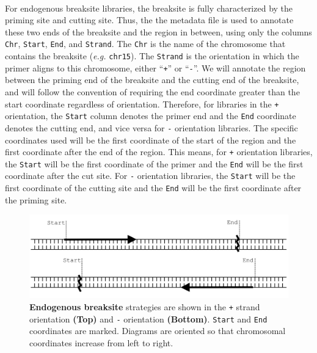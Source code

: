 \documentclass{article}
\begin{document}
\paragraph{} For endogenous breaksite libraries, the breaksite is fully characterized by the priming site and cutting site. Thus, the the metadata file is used to annotate these two ends of the breaksite and the region in between, using only the columns \texttt{Chr}, \texttt{Start}, \texttt{End}, and \texttt{Strand}. The \texttt{Chr} is the name of the chromosome that contains the breaksite (\emph{e.g.} \texttt{chr15}). The \texttt{Strand} is the orientation in which the primer aligns to this chromosome, either ``\texttt{+}'' or ``\texttt{-}''. We will annotate the region between the priming end of the breaksite and the cutting end of the breaksite, and will follow the convention of requiring the end coordinate greater than the start coordinate regardless of orientation. Therefore, for libraries in the \texttt{+} orientation, the \texttt{Start} column denotes the primer end and the \texttt{End} coordinate denotes the cutting end, and vice versa for \texttt{-} orientation libraries. The specific coordinates used will be the first coordinate of the start of the region and the first coordinate after the end of the region. This means, for \texttt{+} orientation libraries, the \texttt{Start} will be the first coordinate of the primer and the \texttt{End} will be the first coordinate after the cut site. For \texttt{-} orientation libraries, the \texttt{Start} will be the first coordinate of the cutting site and the \texttt{End} will be the first coordinate after the priming site.
\begin{figure}[ht]
\centering
  \includegraphics[width=\textwidth]{endogenous_breaksite}
\caption{\textbf{Endogenous breaksite} strategies are shown in the \texttt{+} strand orientation \textbf{(Top)} and \texttt{-} orientation \textbf{(Bottom)}. \texttt{Start} and \texttt{End} coordinates are marked. Diagrams are oriented so that chromosomal coordinates increase from left to right.}
\label{overflow}
\end{figure}
\end{document}
